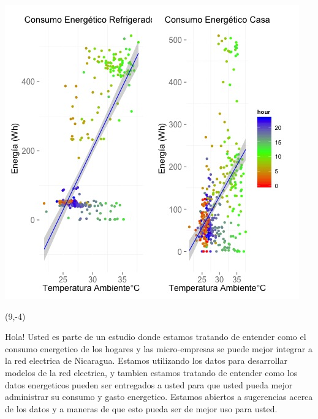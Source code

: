 \documentclass{article}\usepackage[]{graphicx}\usepackage[]{color}
\newenvironment{knitrout}{}{} %
\begin{document}
\begin{knitrout}
\color{fgcolor}
\includegraphics[scale=0.75]{figure/A2_correlaciones} 
\end{knitrout}

 \begin{textblock}{1}(9,-4)
\begin{minipage}{20em}
\begingroup

\endgroup
\end{minipage}
\end{textblock}

\vspace{70px}
\begin{knitrout}
Hola! Usted es parte de un estudio donde estamos tratando de entender como el consumo energetico de los hogares y las micro-empresas se puede mejor integrar a la red electrica de Nicaragua. Estamos utilizando los datos para desarrollar modelos de la red electrica, y tambien estamos tratando de entender como los datos energeticos pueden ser entregados a usted para que usted pueda mejor administrar su consumo y gasto energetico.  Estamos abiertos a sugerencias acerca de los datos y a maneras de que esto pueda ser de mejor uso para usted.
\end{knitrout}
\end{document}
